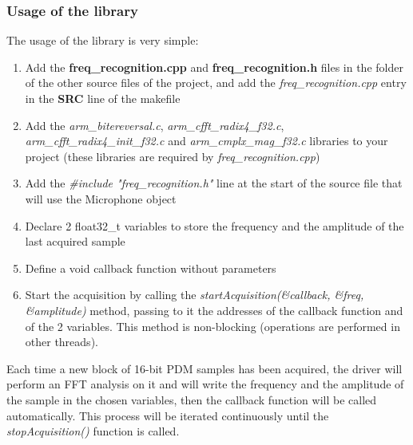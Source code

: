 \subsubsection{Usage of the library}
The usage of the library is very simple:
\begin{enumerate}
	\item Add the \textbf{freq\_recognition.cpp} and \textbf{freq\_recognition.h} files in the folder of the other source files of the project, and add the \textit{freq\_recognition.cpp} entry in the \textbf{SRC} line of the makefile
	\item Add the \textit{arm\_bitereversal.c}, \textit{arm\_cfft\_radix4\_f32.c}, \textit{arm\_cfft\_radix4\_init\_f32.c} and \textit{arm\_cmplx\_mag\_f32.c} libraries to your project (these libraries are required by \textit{freq\_recognition.cpp})
	\item Add the \textit{\#include "freq\_recognition.h"} line at the start of the source file that will use the Microphone object
	\item Declare 2 float32\_t variables to store the frequency and the amplitude of the last acquired sample
	\item Define a void callback function without parameters
	\item Start the acquisition by calling the \textit{startAcquisition(\&callback, \&freq, \&amplitude)} method, passing to it the addresses of the callback function and of the 2 variables. This method is non-blocking (operations are performed in other threads).

\end{enumerate}
Each time a new block of 16-bit PDM samples has been acquired, the driver will perform an FFT analysis on it and will write the frequency and the amplitude of the sample in the chosen variables, then the callback function will be called automatically. This process will be iterated continuously until the \textit{stopAcquisition()} function is called.